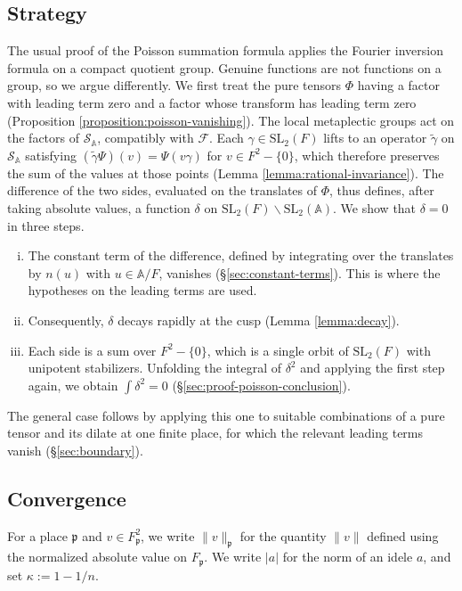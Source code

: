 \documentclass[reqno]{amsart}
\theoremstyle{plain}
\theoremstyle{definition}
\theoremstyle{itplain}
\numberwithin{equation}{section}
\numberwithin{theorem}{section}
\begin{document}
\subsection{Strategy}\label{sec:strategy}
The usual proof of the Poisson summation formula applies the Fourier inversion formula on a compact quotient group.  Genuine functions are not functions on a group, so we argue differently.  We first treat the pure tensors $\Phi$ having a factor with leading term zero and a factor whose transform has leading term zero (Proposition \ref{proposition:poisson-vanishing}).  The local metaplectic groups act on the factors of $\mathcal{S}_{\mathbb{A}}$, compatibly with $\mathcal{F}$.  Each $\gamma \in \mathrm{SL}_2(F)$ lifts to an operator $\tilde{\gamma}$ on $\mathcal{S}_{\mathbb{A}}$ satisfying $(\tilde{\gamma} \Psi)(v) = \Psi(v \gamma)$ for $v \in F^2 - \{0\}$, which therefore preserves the sum of the values at those points (Lemma \ref{lemma:rational-invariance}).  The difference of the two sides, evaluated on the translates of $\Phi$, thus defines, after taking absolute values, a function $\delta$ on $\mathrm{SL}_2(F) \backslash \mathrm{SL}_2(\mathbb{A})$.  We show that $\delta = 0$ in three steps.
\begin{enumerate}[(i)]
\item The constant term of the difference, defined by integrating over the translates by $n(u)$ with $u \in \mathbb{A} / F$, vanishes (\S\ref{sec:constant-terms}).  This is where the hypotheses on the leading terms are used.
\item Consequently, $\delta$ decays rapidly at the cusp (Lemma \ref{lemma:decay}).
\item Each side is a sum over $F^2 - \{0\}$, which is a single orbit of $\mathrm{SL}_2(F)$ with unipotent stabilizers.  Unfolding the integral of $\delta^2$ and applying the first step again, we obtain $\int \delta^2 = 0$ (\S\ref{sec:proof-poisson-conclusion}).
\end{enumerate}
The general case follows by applying this one to suitable combinations of a pure tensor and its dilate at one finite place, for which the relevant leading terms vanish (\S\ref{sec:boundary}).

\subsection{Convergence}\label{sec:theta-sums}
For a place $\mathfrak{p}$ and $v \in F_{\mathfrak{p}}^2$, we write $\lVert v \rVert_{\mathfrak{p}}$ for the quantity $\lVert v \rVert$ defined using the normalized absolute value on $F_{\mathfrak{p}}$.  We write $\lvert a \rvert$ for the norm of an idele $a$, and set $\kappa := 1 - 1/n$.
\end{document}
